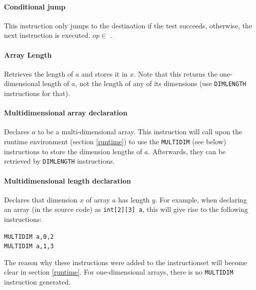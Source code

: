 \documentclass[a4paper]{article}
\begin{document}
\paragraph{Conditional jump\\}

This instruction only jumps to the destination if the test succeeds,
otherwise, the next instruction is executed. $op \in$ \varset{$<$,$>$,$=$,$\neq$}.

\paragraph{Array Length\\}

Retrieves the length of $a$ and stores it in $x$. Note that this returns the
one-dimensional length of $a$, not the length of any of its dimensions (use
\texttt{DIMLENGTH} instructions for that).

\paragraph{Multidimensional array declaration\\}

Declares $a$ to be a multi-dimensional array. This instruction will call upon the
runtime environment (section \ref{runtime}) to use the \texttt{MULTIDIM} (see
below) instructions to store the dimension lengths of $a$. Afterwards, they
can be retrieved by \texttt{DIMLENGTH} instructions. 

\paragraph{Multidimensional length declaration\\}

Declares that dimension $x$ of array $a$ has length $y$.
For example, when declaring an array (in the source code) as \texttt{int[2][3] a},
this will give rise to the following instructions:
\begin{center}
\texttt{MULTIDIM a,0,2}\\
\texttt{MULTIDIM a,1,3}\\
\end{center}

The reason why these instructions were added to the instructionset will become
clear in section \ref{runtime}. For one-dimensional arrays, there is no
\texttt{MULTIDIM} instruction generated.
\end{document}
